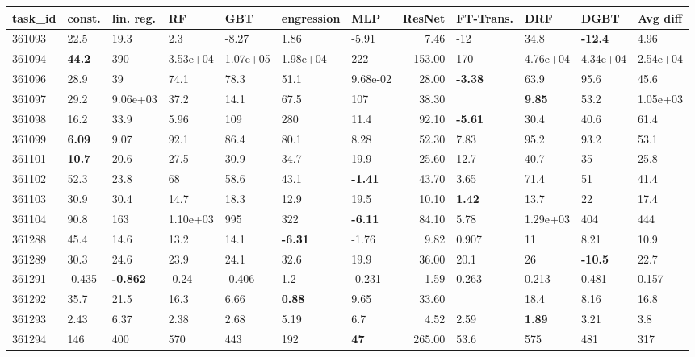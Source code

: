 \begin{table}[ht!]
\centering
\begingroup\footnotesize
\begin{tabular}{lllllllrllll}
  \hline
\hline
task\_id & const. & lin. reg. & RF & GBT & engression & MLP & ResNet & FT-Trans. & DRF & DGBT & Avg diff \\ 
  \hline
361093 & 22.5 & 19.3 & 2.3 & -8.27 & 1.86 & -5.91 & 7.46 & -12 & 34.8 & \textbf{-12.4} & 4.96 \\ 
  361094 & \textbf{44.2} & 390 & 3.53e+04 & 1.07e+05 & 1.98e+04 & 222 & 153.00 & 170 & 4.76e+04 & 4.34e+04 & 2.54e+04 \\ 
  361096 & 28.9 & 39 & 74.1 & 78.3 & 51.1 & 9.68e-02 & 28.00 & \textbf{-3.38} & 63.9 & 95.6 & 45.6 \\ 
  361097 & 29.2 & 9.06e+03 & 37.2 & 14.1 & 67.5 & 107 & 38.30 &  & \textbf{9.85} & 53.2 & 1.05e+03 \\ 
  361098 & 16.2 & 33.9 & 5.96 & 109 & 280 & 11.4 & 92.10 & \textbf{-5.61} & 30.4 & 40.6 & 61.4 \\ 
  361099 & \textbf{6.09} & 9.07 & 92.1 & 86.4 & 80.1 & 8.28 & 52.30 & 7.83 & 95.2 & 93.2 & 53.1 \\ 
  361101 & \textbf{10.7} & 20.6 & 27.5 & 30.9 & 34.7 & 19.9 & 25.60 & 12.7 & 40.7 & 35 & 25.8 \\ 
  361102 & 52.3 & 23.8 & 68 & 58.6 & 43.1 & \textbf{-1.41} & 43.70 & 3.65 & 71.4 & 51 & 41.4 \\ 
  361103 & 30.9 & 30.4 & 14.7 & 18.3 & 12.9 & 19.5 & 10.10 & \textbf{1.42} & 13.7 & 22 & 17.4 \\ 
  361104 & 90.8 & 163 & 1.10e+03 & 995 & 322 & \textbf{-6.11} & 84.10 & 5.78 & 1.29e+03 & 404 & 444 \\ 
  361288 & 45.4 & 14.6 & 13.2 & 14.1 & \textbf{-6.31} & -1.76 & 9.82 & 0.907 & 11 & 8.21 & 10.9 \\ 
  361289 & 30.3 & 24.6 & 23.9 & 24.1 & 32.6 & 19.9 & 36.00 & 20.1 & 26 & \textbf{-10.5} & 22.7 \\ 
  361291 & -0.435 & \textbf{-0.862} & -0.24 & -0.406 & 1.2 & -0.231 & 1.59 & 0.263 & 0.213 & 0.481 & 0.157 \\ 
  361292 & 35.7 & 21.5 & 16.3 & 6.66 & \textbf{0.88} & 9.65 & 33.60 &  & 18.4 & 8.16 & 16.8 \\ 
  361293 & 2.43 & 6.37 & 2.38 & 2.68 & 5.19 & 6.7 & 4.52 & 2.59 & \textbf{1.89} & 3.21 & 3.8 \\ 
  361294 & 146 & 400 & 570 & 443 & 192 & \textbf{47} & 265.00 & 53.6 & 575 & 481 & 317 \\ 

\end{tabular}
\end{table}
